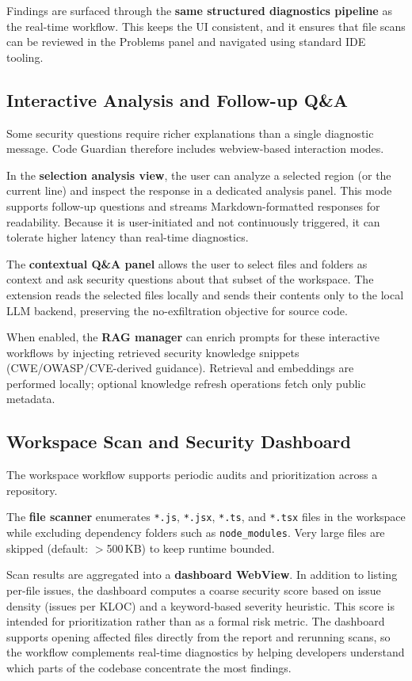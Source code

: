 Findings are surfaced through the \textbf{same structured diagnostics pipeline} as the real-time workflow. This keeps the UI consistent, and it ensures that file scans can be reviewed in the Problems panel and navigated using standard IDE tooling.

\subsection{Interactive Analysis and Follow-up Q\&A}
\label{subsec:interactive-analysis}

Some security questions require richer explanations than a single diagnostic message. Code Guardian therefore includes webview-based interaction modes.

In the \textbf{selection analysis view}, the user can analyze a selected region (or the current line) and inspect the response in a dedicated analysis panel. This mode supports follow-up questions and streams Markdown-formatted responses for readability. Because it is user-initiated and not continuously triggered, it can tolerate higher latency than real-time diagnostics.

The \textbf{contextual Q\&A panel} allows the user to select files and folders as context and ask security questions about that subset of the workspace. The extension reads the selected files locally and sends their contents only to the local LLM backend, preserving the no-exfiltration objective for source code.

When enabled, the \textbf{RAG manager} can enrich prompts for these interactive workflows by injecting retrieved security knowledge snippets (CWE/OWASP/CVE-derived guidance). Retrieval and embeddings are performed locally; optional knowledge refresh operations fetch only public metadata.

\subsection{Workspace Scan and Security Dashboard}
\label{subsec:workspace-scan}

The workspace workflow supports periodic audits and prioritization across a repository.

The \textbf{file scanner} enumerates \texttt{*.js}, \texttt{*.jsx}, \texttt{*.ts}, and \texttt{*.tsx} files in the workspace while excluding dependency folders such as \texttt{node\_modules}. Very large files are skipped (default: $>$500\,KB) to keep runtime bounded.

Scan results are aggregated into a \textbf{dashboard WebView}. In addition to listing per-file issues, the dashboard computes a coarse security score based on issue density (issues per KLOC) and a keyword-based severity heuristic. This score is intended for prioritization rather than as a formal risk metric. The dashboard supports opening affected files directly from the report and rerunning scans, so the workflow complements real-time diagnostics by helping developers understand which parts of the codebase concentrate the most findings.


